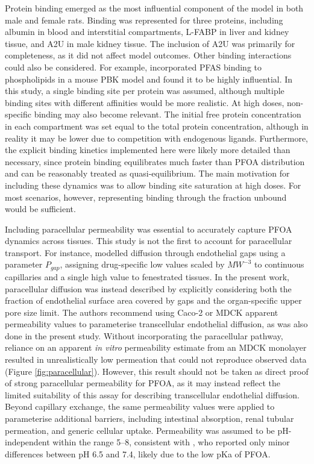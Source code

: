 \documentclass[preprint,12pt,authoryear]{elsarticle}
\begin{document}
Protein binding emerged as the most influential component of the model in both male and female rats. Binding was represented for three proteins, including albumin in blood and interstitial compartments, L-FABP in liver and kidney tissue, and A2U in male kidney tissue. The inclusion of A2U was primarily for completeness, as it did not affect model outcomes. Other binding interactions could also be considered. For example, \citet{fischer_2025} incorporated PFAS binding to phospholipids in a mouse PBK model and found it to be highly influential. In this study, a single binding site per protein was assumed, although multiple binding sites with different affinities would be more realistic. At high doses, non-specific binding may also become relevant. The initial free protein concentration in each compartment was set equal to the total protein concentration, although in reality it may be lower due to competition with endogenous ligands. Furthermore, the explicit binding kinetics implemented here were likely more detailed than necessary, since protein binding equilibrates much faster than PFOA distribution and can be reasonably treated as quasi-equilibrium. The main motivation for including these dynamics was to allow binding site saturation at high doses. For most scenarios, however, representing binding through the fraction unbound would be sufficient.



Including paracellular permeability was essential to accurately capture PFOA dynamics across tissues. This study is not the first to account for paracellular transport. For instance, \citet{korzekwa_2022} modelled diffusion through endothelial gaps using a parameter $P_{gap}$, assigning drug-specific low values scaled by $MW^{-3}$ to continuous capillaries and a single high value to fenestrated tissues. In the present work, paracellular diffusion was instead described by explicitly considering both the fraction of endothelial surface area covered by gaps and the organ-specific upper pore size limit. The authors recommend using Caco-2 or MDCK apparent permeability values to parameterise transcellular endothelial diffusion, as was also done in the present study. Without incorporating the paracellular pathway, reliance on an apparent \textit{in vitro} permeability estimate from an MDCK monolayer \citep{ryu_2024} resulted in unrealistically low permeation that could not reproduce observed data (Figure \ref{fig:paracellular}). However, this result should not be taken as direct proof of strong paracellular permeability for PFOA, as it may instead reflect the limited suitability of this assay for describing transcellular endothelial diffusion. Beyond capillary exchange, the same permeability values were applied to parameterise additional barriers, including intestinal absorption, renal tubular permeation, and generic cellular uptake. Permeability was assumed to be pH-independent within the range 5–8, consistent with \citet{ryu_2024}, who reported only minor differences between pH 6.5 and 7.4, likely due to the low pKa of PFOA.
\end{document}
